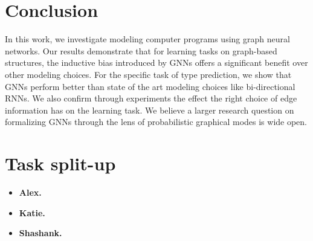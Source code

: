 \section{Conclusion}
\label{sec:conclusions}

In this work, we investigate modeling computer programs using graph neural networks. Our results demonstrate that for learning tasks on graph-based structures, the inductive bias introduced by GNNs offers a significant benefit over other modeling choices. For the specific task of type prediction, we show that GNNs perform better than state of the art modeling choices like bi-directional RNNs. We also confirm through experiments the effect the right choice of edge information has on the learning task. We believe a larger research question on formalizing GNNs through the lens of probabilistic graphical modes is wide open.  

\section{Task split-up}
\begin{itemize}[]
	\item \textbf{Alex.}
	\item \textbf{Katie.}
	\item \textbf{Shashank.}
\end{itemize}

